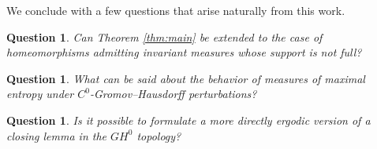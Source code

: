 \documentclass{amsart}
\numberwithin{equation}{section}
\newtheorem{question}[theorem]{Question}
\theoremstyle{remark}
\begin{document}
We conclude with a few questions that arise naturally from this work.

\begin{question}
Can Theorem \ref{thm:main} be extended to the case of homeomorphisms admitting invariant measures whose support is not full?
\end{question}

\begin{question}
What can be said about the behavior of measures of maximal entropy under $C^0$-Gromov--Hausdorff perturbations?
\end{question}

\begin{question}
Is it possible to formulate a more directly ergodic version of a closing lemma in the $GH^0$ topology?
\end{question}



\end{document}
